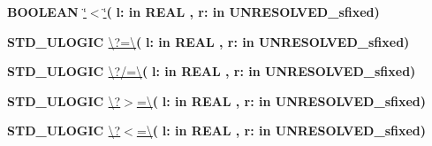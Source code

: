 \begin{DoxyCompactItemize}
\item 
{\bfseries {\bfseries \textcolor{comment}{B\+O\+O\+L\+E\+A\+N}\textcolor{vhdlchar}{ }}} \hyperlink{class__fixed__pkg_a5d059cf3277e3585e4f3f076db10b273}{\char`\"{}$<$\char`\"{}}{\bfseries  ( }{\bfseries \textcolor{vhdlchar}{l\+: }\textcolor{stringliteral}{in }{\bfseries \textcolor{comment}{R\+E\+A\+L}\textcolor{vhdlchar}{ }}}{\bfseries  , \textcolor{vhdlchar}{r\+: }\textcolor{stringliteral}{in }\textcolor{vhdlchar}{U\+N\+R\+E\+S\+O\+L\+V\+E\+D\+\_\+sfixed}}{\bfseries  )} 
\item 
{\bfseries {\bfseries \textcolor{comment}{S\+T\+D\+\_\+\+U\+L\+O\+G\+I\+C}\textcolor{vhdlchar}{ }}} \hyperlink{class__fixed__pkg_a69151531d87456d952c2073704fa1779}{\textbackslash{}?=\textbackslash{}}{\bfseries  ( }{\bfseries \textcolor{vhdlchar}{l\+: }\textcolor{stringliteral}{in }{\bfseries \textcolor{comment}{R\+E\+A\+L}\textcolor{vhdlchar}{ }}}{\bfseries  , \textcolor{vhdlchar}{r\+: }\textcolor{stringliteral}{in }\textcolor{vhdlchar}{U\+N\+R\+E\+S\+O\+L\+V\+E\+D\+\_\+sfixed}}{\bfseries  )} 
\item 
{\bfseries {\bfseries \textcolor{comment}{S\+T\+D\+\_\+\+U\+L\+O\+G\+I\+C}\textcolor{vhdlchar}{ }}} \hyperlink{class__fixed__pkg_a172a73302b09f0d298b93ecda8c5e976}{\textbackslash{}?/=\textbackslash{}}{\bfseries  ( }{\bfseries \textcolor{vhdlchar}{l\+: }\textcolor{stringliteral}{in }{\bfseries \textcolor{comment}{R\+E\+A\+L}\textcolor{vhdlchar}{ }}}{\bfseries  , \textcolor{vhdlchar}{r\+: }\textcolor{stringliteral}{in }\textcolor{vhdlchar}{U\+N\+R\+E\+S\+O\+L\+V\+E\+D\+\_\+sfixed}}{\bfseries  )} 
\item 
{\bfseries {\bfseries \textcolor{comment}{S\+T\+D\+\_\+\+U\+L\+O\+G\+I\+C}\textcolor{vhdlchar}{ }}} \hyperlink{class__fixed__pkg_a3adee8c12e5c0bb76fc3e1a493284a27}{\textbackslash{}?$>$=\textbackslash{}}{\bfseries  ( }{\bfseries \textcolor{vhdlchar}{l\+: }\textcolor{stringliteral}{in }{\bfseries \textcolor{comment}{R\+E\+A\+L}\textcolor{vhdlchar}{ }}}{\bfseries  , \textcolor{vhdlchar}{r\+: }\textcolor{stringliteral}{in }\textcolor{vhdlchar}{U\+N\+R\+E\+S\+O\+L\+V\+E\+D\+\_\+sfixed}}{\bfseries  )} 
\item 
{\bfseries {\bfseries \textcolor{comment}{S\+T\+D\+\_\+\+U\+L\+O\+G\+I\+C}\textcolor{vhdlchar}{ }}} \hyperlink{class__fixed__pkg_a271da29f659a2bc9480dbd29d7727913}{\textbackslash{}?$<$=\textbackslash{}}{\bfseries  ( }{\bfseries \textcolor{vhdlchar}{l\+: }\textcolor{stringliteral}{in }{\bfseries \textcolor{comment}{R\+E\+A\+L}\textcolor{vhdlchar}{ }}}{\bfseries  , \textcolor{vhdlchar}{r\+: }\textcolor{stringliteral}{in }\textcolor{vhdlchar}{U\+N\+R\+E\+S\+O\+L\+V\+E\+D\+\_\+sfixed}}{\bfseries  )} 

\end{DoxyCompactItemize}
